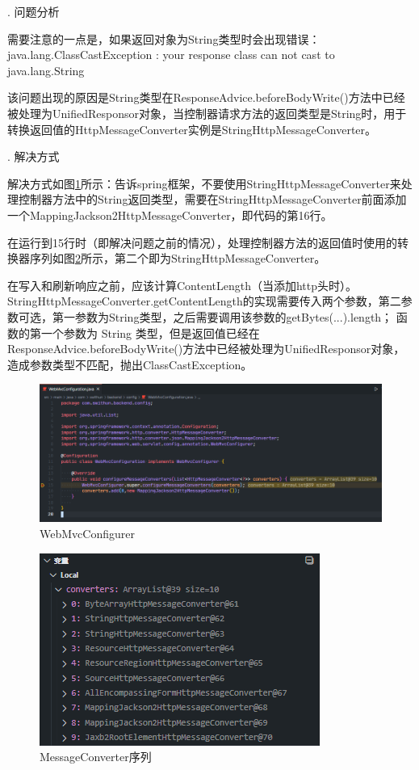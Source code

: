 . 问题分析

需要注意的一点是，如果返回对象为String类型时会出现错误：java.lang.ClassCastException :  your response class can not cast to java.lang.String

该问题出现的原因是String类型在ResponseAdvice.beforeBodyWrite()方法中已经被处理为UnifiedResponsor对象，当控制器请求方法的返回类型是String时，用于转换返回值的HttpMessageConverter实例是StringHttpMessageConverter。

. 解决方式

解决方式如图\ref{WebMvcConfigurer}所示：告诉spring框架，不要使用StringHttpMessageConverter来处理控制器方法中的String返回类型，需要在StringHttpMessageConverter前面添加一个MappingJackson2HttpMessageConverter，即代码的第16行。

在运行到15行时（即解决问题之前的情况），处理控制器方法的返回值时使用的转换器序列如图\ref{MessageConverter-list}所示，第二个即为StringHttpMessageConverter。

在写入和刷新响应之前，应该计算ContentLength（当添加http头时）。StringHttpMessageConverter.getContentLength的实现需要传入两个参数，第二参数可选，第一参数为String类型，之后需要调用该参数的getBytes(...).length； 函数的第一个参数为 String 类型，但是返回值已经在ResponseAdvice.beforeBodyWrite()方法中已经被处理为UnifiedResponsor对象，造成参数类型不匹配，抛出ClassCastException。

\begin{figure}[htbp]
  \centering
  \includegraphics[scale = 0.6]{out/figure/统一返回对象/WebMvcConfiguration-MessageConverter-Code.png}
  \caption{\song\wuhao WebMvcConfigurer}
  \label{WebMvcConfigurer}
\end{figure}

\begin{figure}[htbp]
  \centering
  \includegraphics[scale = 0.8]{out/figure/统一返回对象/WebMvcConfiguration-MessageConverter-debug.png}
  \caption{\song\wuhao MessageConverter序列}
  \label{MessageConverter-list}
\end{figure}

